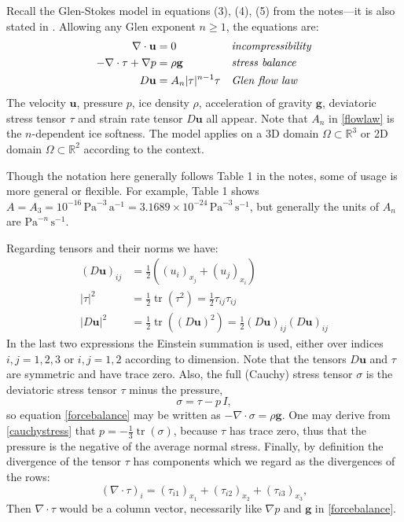 \documentclass[letterpaper,final,12pt,reqno]{amsart}
\newcommand{\RR}{\mathbb{R}}
\newcommand{\Div}{\nabla\cdot}
\newcommand{\trace}{\operatorname{tr}}
\newcommand{\bg}{\mathbf{g}}
\newcommand{\bu}{\mathbf{u}}
\begin{document}
Recall the Glen-Stokes model in equations (3), (4), (5) from the notes---it is also stated in \cite{GreveBlatter2009,JouvetRappaz2011}.  Allowing any Glen exponent $n\ge 1$, the equations are:
\begin{align}
\nabla \cdot \bu &= 0 &&\text{\emph{incompressibility}} \label{incompressible} \\
- \nabla \cdot \tau + \nabla p &= \rho \bg &&\text{\emph{stress balance}} \label{forcebalance} \\
D\bu &= A_n |\tau|^{n-1} \tau &&\text{\emph{Glen flow law}} \label{flowlaw}
\end{align}
The velocity $\bu$, pressure $p$, ice density $\rho$, acceleration of gravity $\bg$, deviatoric stress tensor $\tau$ and strain rate tensor $D\bu$ all appear.  Note that $A_n$ in \eqref{flowlaw} is the $n$-dependent ice softness.  The model applies on a 3D domain $\Omega\subset \RR^3$ or 2D domain $\Omega \subset \RR^2$ according to the context.

Though the notation here generally follows Table 1 in the notes, some of usage is more general or flexible.  For example, Table 1 shows $A = A_3 = 10^{-16} \,\text{Pa}^{-3}\,\text{a}^{-1} = 3.1689 \times 10^{-24} \,\text{Pa}^{-3}\,\text{s}^{-1}$, but generally the units of $A_n$ are $\text{Pa}^{-n}\,\text{s}^{-1}$.

Regarding tensors and their norms we have:
\begin{align*}
(D\bu)_{ij} &= \frac{1}{2} \left((u_i)_{x_j} + (u_j)_{x_i}\right) \\
|\tau|^2 &= \frac{1}{2} \trace\left(\tau^2\right) = \frac{1}{2} \tau_{ij} \tau_{ij} \\
|D\bu|^2 &= \frac{1}{2} \trace\left((D\bu)^2\right) = \frac{1}{2} (D\bu)_{ij} (D\bu)_{ij}
\end{align*}
In the last two expressions the Einstein summation is used, either over indices $i,j=1,2,3$ or $i,j=1,2$ according to dimension.  Note that the tensors $D\bu$ and $\tau$ are symmetric and have trace zero.  Also, the full (Cauchy) stress tensor $\sigma$ is the deviatoric stress tensor $\tau$ minus the pressure,
\begin{equation}
    \sigma = \tau - p\,I,  \label{cauchystress}
\end{equation}
so equation \eqref{forcebalance} may be written as $-\Div \sigma = \rho \bg$.  One may derive from \eqref{cauchystress} that $p = -\frac{1}{3} \trace(\sigma)$, because $\tau$ has trace zero, thus that the pressure is the negative of the average normal stress.  Finally, by definition the divergence of the tensor $\tau$ has components which we regard as the divergences of the rows:
    $$\left(\nabla \cdot \tau\right)_i = \left(\tau_{i1}\right)_{x_1} + \left(\tau_{i2}\right)_{x_2} + \left(\tau_{i3}\right)_{x_3},$$
Then $\nabla\cdot \tau$ would be a column vector, necessarily like $\nabla p$ and $\bg$ in \eqref{forcebalance}.
\end{document}
